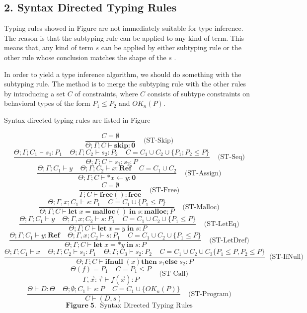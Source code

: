 \documentclass[english]{jssst_ppl} %
\newcommand\LET{\mathbf{let}\;}
\newcommand\IN{\mathbf{in}\;}
\newcommand\SKIP{\mathbf{skip}}
\newcommand\Rtab{\; \; \; \;}
\newcommand\IFNULL{\mathbf{ifnull}\;}
\newcommand\THEN{\mathbf{then}\;}
\newcommand\ELSE{\mathbf{else}\;}
\newcommand\Malloc{\mathbf{malloc}}
\newcommand\Free{\mathbf{free}}
\newcommand\Cirx{(x)}
\theoremstyle{definition}
\begin{document}
\subsection*{2. Syntax Directed Typing Rules}
Typing rules showed in Figure  are not immediately suitable for type inference. The reason is that the subtyping rule can be applied to any kind of term. This means that, any kind of term $s$ can be applied by either subtyping rule or the other rule whose conclusion matches the shape of the $s$ \cite{plain:book1}.

In order to yield a type inference algorithm, we should do something with the subtyping rule. The method is to merge the subtyping rule with the other rules by introducing a set $C$ of constraints, where $C$ consists of subtype constraints on behavioral types of the form $P_{1}\le P_{2}$ and $OK_{n}(P)$.

Syntax directed typing rules are listed in Figure 

$$
     \frac{ C = \emptyset}
           {\Theta; \Gamma; C \vdash \SKIP : \mathbf{0}}
      \Rtab \mbox{(ST-Skip)}
$$
$$
      \frac{\Theta;\Gamma ; C_{1} \vdash s_{1} : P_{1} \Rtab \Theta; \Gamma ; C_{2} \vdash s_{2} : P_{2} \Rtab C = C_{1}\cup C_{2} \cup \{ P_{1};P_{2} \le P\}}
      {\Theta;\Gamma; C \vdash s_{1};s_{2} : P}
      \Rtab \mbox{(ST-Seq)}
$$
$$
      \frac{\Theta;\Gamma;C_{1} \vdash y \Rtab \Theta;\Gamma; C_{2} \vdash x : \mathbf{Ref} \Rtab C = C_{1}\cup C_{2}}
      {\Theta;\Gamma; C \vdash *x \leftarrow y : \mathbf{0}}
      \Rtab \mbox{(ST-Assign)}
$$
$$
      \frac{C = \emptyset}
      {\Gamma ; C \vdash \Free() : \Free}
     \Rtab \mbox{(ST-Free)}
$$
$$
     \frac{\Theta;\Gamma, x ; C_{1} \vdash s : P_{1} \Rtab C = C_{1} \cup\{P_{1}\le P\}}
     {\Theta;\Gamma; C \vdash \LET x = \Malloc() \; \IN s : \Malloc ; P}
     \Rtab \mbox{(ST-Malloc)}
$$
$$
     \frac{\Theta;\Gamma; C_{1} \vdash y \Rtab \Theta;\Gamma, x ; C_{2} \vdash s : P_{1} \Rtab C = C_{1}\cup C_{2} \cup \{P_{1} \le P \}}
     {\Theta;\Gamma ; C \vdash \LET x = y \;  \IN s : P}
     \Rtab \mbox{(ST-LetEq)}
$$
$$
     \frac{\Theta;\Gamma ; C_{1} \vdash y: \mathbf{Ref} \Rtab \Theta;\Gamma, x ; C_{2} \vdash s : P_{1} \Rtab C = C_{1}\cup C_{2}\cup\{P_{1} \le P\}}
     {\Theta;\Gamma ; C \vdash \LET x = *y \; \IN s : P}
     \Rtab \mbox{(ST-LetDref)}
$$
$$
     \frac{\Theta;\Gamma; C_{1} \vdash x \Rtab \Theta;\Gamma; C_{2} \vdash s_{1} : P_{1} \Rtab \Theta;\Gamma; C_{3} \vdash s_{2} : P_{2}  \Rtab  C = C_{1} \cup C_{2} \cup C_{3} \{P_{1}\le P, P_{2}\le P \}}
     {\Theta;\Gamma; C \vdash \IFNULL\Cirx \THEN s_{1} \ELSE s_{2} : P }
    \; \;  \mbox{(ST-IfNull)}
$$
$$
     \frac{\Theta(f) = P_{1} \Rtab C = P_{1} \le P}
     {\Gamma,\vec{x}:\vec{\tau} \vdash f(\vec{x}) : P }
     \Rtab \mbox{(ST-Call)}
$$
$$
     \frac{\Theta \vdash D : \Theta \Rtab \Theta ; \emptyset ; C_{1} \vdash s : P \Rtab C = C_{1}\cup\{OK_{n}(P)\}}
     {C \vdash (D , s) }
     \Rtab \mbox{(ST-Program)}
$$
$$
    \mathbf{Figure \; 5.} \;\; \mbox{Syntax Directed Typing Rules}
$$
\end{document}
